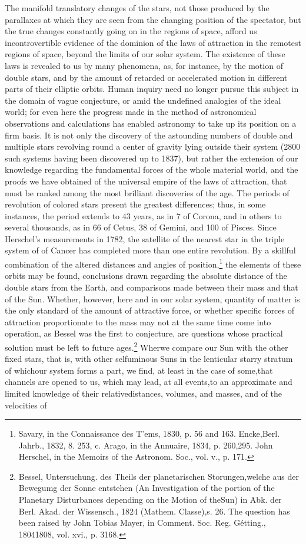 The manifold translatory changes of the stars, not those produced by the parallaxes at which they are seen from the changing position of the spectator, but the true changes constantly going on in the regions of space, afford us incontrovertible evidence of the dominion of the laws of attraction in the remotest regions of space, beyond the limits of our solar system. The existence of these laws is revealed to us by many phenomena, as, for instance, by the motion of double stars, and by the amount of retarded or accelerated motion in different parts of their elliptic orbits. Human inquiry need no longer pursue this subject in the domain of vague conjecture, or amid the undefined analogies of the ideal world; for even here the progress made in the method of astronomical observations and calculations has enabled astronomy to take up its position on a firm basis. It is not only the discovery of the astounding numbers of double and multiple stars revolving round a center of gravity lying outside their system (2800 such systems having been discovered up to 1837), but rather the extension of our knowledge regarding the fundamental forces of the whole material world, and the proofs we have obtained of the universal empire of the laws of attraction, that must be ranked among the most brilliant discoveries of the age. The periods of revolution of colored stars present the greatest differences; thus, in some instances, the period extends to 43 years, as in 7 of Corona, and in others to several thousands, as in 66 of Cetus, 38 of Gemini, and 100 of Pisces. Since Herschel's measurements in 1782, the satellite of the nearest star in the triple system of  of Cancer has completed more than one entire revolution. By a skillful combination of the altered distances and angles of position,\footnote{Savary, in the Connaissance des T'ems, 1830, p. 56 and 163. Encke,Berl. Jahrb., 1832, 8. 253, c. Arago, in the Annuaire, 1834, p. 260,295. John Herschel, in the Memoirs of the Astronom. Soc., vol. v., p. 171.} the elements of these orbits may be found, conclusions drawn regarding the absolute distance of the double stars from the Earth, and comparisons made between their mass and that of the Sun. Whether, however, here and in our solar system, quantity of matter is the only standard of the amount of attractive force, or whether specific forces of attraction proportionate to the mass may not at the same time come into operation, as Bessel was the first to conjecture, are questions whose practical solution must be left to future ages.\footnote{Bessel, Untersuchung. des Theils der planetarischen Storungen,welche aus der Bewegumg der Sonne entstehen (An Investigation of the portion of the Planetary Disturbances depending on the Motion of theSun) in Abk. der Berl. Akad. der Wissensch., 1824 (Mathem. Classe),s. 26. The question has been raised by John Tobias Mayer, in Comment. Soc. Reg. G\'{e}tting., 18041808, vol. xvi., p. 3168.} Wherwe compare our Sun with the other fixed stars, that is, with other selfuminous Suns in the lenticular starry stratum of whichour system forms a part, we find, at least in the case of some,that channels are opened to us, which may lead, at all events,to an approximate and limited knowledge of their relativedistances, volumes, and masses, and of the velocities of 